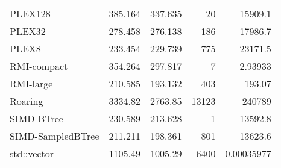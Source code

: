 \begin{tabular}{lrrrr}
 PLEX128           &                385.164 &               337.635 &           20 &  15909.1        \\
 PLEX32            &                278.458 &               276.138 &          186 &  17986.7        \\
 PLEX8             &                233.454 &               229.739 &          775 &  23171.5        \\
 RMI-compact       &                354.264 &               297.817 &            7 &      2.93933    \\
 RMI-large         &                210.585 &               193.132 &          403 &    193.07       \\
 Roaring           &               3334.82  &              2763.85  &        13123 & 240789          \\
 SIMD-BTree        &                230.589 &               213.628 &            1 &  13592.8        \\
 SIMD-SampledBTree &                211.211 &               198.361 &          801 &  13623.6        \\
 std::vector       &               1105.49  &              1005.29  &         6400 &      0.00035977 \\
\hline
\end{tabular}